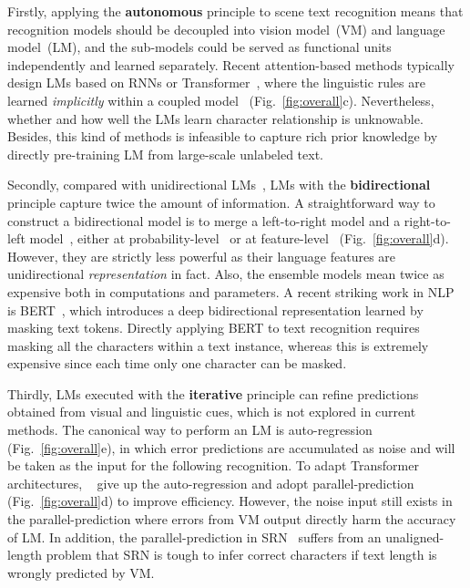 \documentclass[10pt,journal,compsoc]{IEEEtran}
\begin{document}
Firstly, applying the \textbf{autonomous} principle to scene text recognition means that recognition models should be decoupled into vision model~(VM) and language model~(LM), and the sub-models could be served as functional units independently and learned separately. Recent attention-based methods typically design LMs based on RNNs or Transformer~\cite{vaswani2017attention}, where the linguistic rules are learned \emph{implicitly} within a coupled model~\cite{lee2016recursive, shi2018aster, sheng2019nrtr} (Fig.~\ref{fig:overall}c). Nevertheless, whether and how well the LMs learn character relationship is unknowable. Besides, this kind of methods is infeasible to capture rich prior knowledge by directly pre-training LM from large-scale unlabeled text.


Secondly, compared with unidirectional LMs~\cite{sundermeyer2012lstm}, LMs with the \textbf{bidirectional} principle capture twice the amount of information. A straightforward way to construct a bidirectional model is to merge a left-to-right model and a right-to-left model~\cite{peters2018deep, devlin2018bert}, either at probability-level~\cite{wang2020decoupled,shi2018aster} or at feature-level~\cite{yu2020towards} (Fig.~\ref{fig:overall}d). However, they are strictly less powerful as their language features are unidirectional \emph{representation} in fact. Also, the ensemble models mean twice as expensive both in computations and parameters. A recent striking work in NLP is BERT~\cite{devlin2018bert}, which introduces a deep bidirectional representation learned by masking text tokens. Directly applying BERT to text recognition requires masking all the characters within a text instance, whereas this is extremely expensive since each time only one character can be masked.


Thirdly, LMs executed with the \textbf{iterative} principle can refine predictions obtained from visual and linguistic cues, which is not explored in current methods. The canonical way to perform an LM is auto-regression~\cite{wang2020decoupled,cheng2017focusing,wojna2017attention} (Fig.~\ref{fig:overall}e), in which error predictions are accumulated as noise and will be taken as the input for the following recognition. To adapt Transformer architectures, ~\cite{lyu20192d,yu2020towards} give up the auto-regression and adopt parallel-prediction (Fig.~\ref{fig:overall}d) to improve efficiency. However, the noise input still exists in the parallel-prediction where errors from VM output directly harm the accuracy of LM. In addition, the parallel-prediction in SRN~\cite{yu2020towards} suffers from an unaligned-length problem that SRN is tough to infer correct characters if text length is wrongly predicted by VM.
\end{document}
